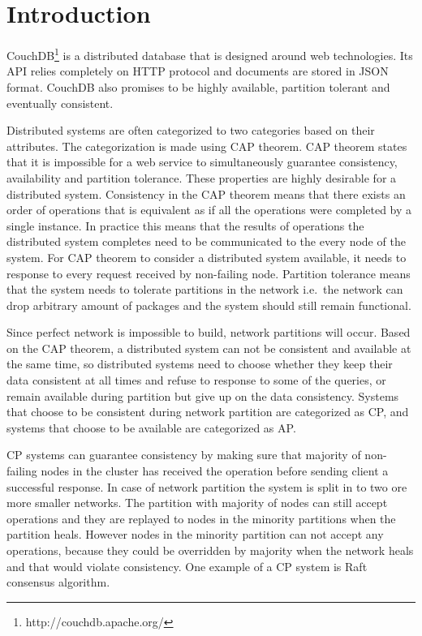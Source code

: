 \section{Introduction}

CouchDB\footnote{http://couchdb.apache.org/} is a distributed database that is
designed around web technologies. Its API relies completely on HTTP protocol and
documents are stored in JSON format. CouchDB also promises to be highly
available, partition tolerant and eventually consistent.

Distributed systems are often categorized to two categories based on their
attributes. The categorization is made using CAP
theorem\cite{gilbert2002brewer}. CAP theorem states that it is impossible for a
web service to simultaneously guarantee consistency, availability and partition
tolerance. These properties are highly desirable for a distributed system.
Consistency in the CAP theorem means that there exists an order of operations
that is equivalent as if all the operations were completed by a single
instance. In practice this means that the results of operations the distributed
system completes need to be communicated to the every node of the system. For
CAP theorem to consider a distributed system available, it needs to response to
every request received by non-failing node. Partition tolerance means that the
system needs to tolerate partitions in the network i.e.\ the network
can drop arbitrary amount of packages and the system should still remain
functional.

Since perfect network is impossible to build, network partitions will occur.
Based on the CAP theorem, a distributed system can not be consistent and
available at the same time, so distributed systems need to choose whether they
keep their data consistent at all times and refuse to response to some of the
queries, or remain available during partition but give up on the data
consistency. Systems that choose to be consistent during network partition are
categorized as CP, and systems that choose to be available are categorized as
AP.\

CP systems can guarantee consistency by making sure that majority of non-failing
nodes in the cluster has received the operation before sending client a
successful response. In case of network partition the system is split in to two
ore more smaller networks. The partition with majority of nodes can still accept
operations and they are replayed to nodes in the minority partitions when the
partition heals. However nodes in the minority partition can not accept any
operations, because they could be overridden by majority when the network heals
and that would violate consistency. One example of a CP system is
Raft consensus algorithm\cite{ongaro2014search}.

